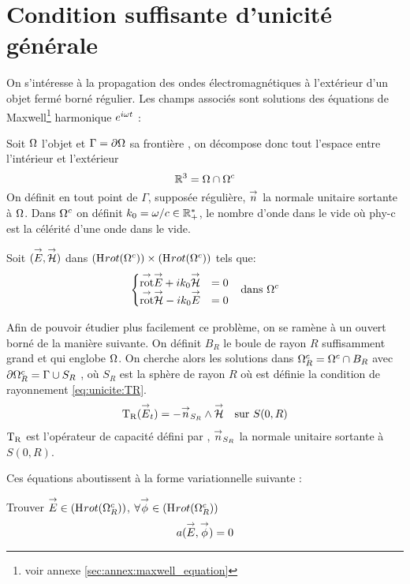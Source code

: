 \section{Condition suffisante d'unicité générale}

  On s’intéresse à la propagation des ondes électromagnétiques à l'extérieur d'un objet fermé borné régulier. Les champs associés sont solutions des équations de Maxwell\footnote{voir annexe \ref{sec:annex:maxwell_equation}} harmonique \(e^{i\omega t}\) :

  Soit \(\Omega\) l'objet et \(\Gamma=\partial\Omega\) sa frontière , on décompose donc tout l'espace entre l'intérieur et l'extérieur 
  \[
    \mathbb R^3 = \Omega\cap\Omega^c
  \]
  On définit en tout point de \(\Gamma\), supposée régulière, \({\overset{\rightarrow}{n}}\) la normale unitaire sortante à \(\Omega\).
 Dans \(\Omega^c\) on définit \(k_0=\omega / c \in \mathbb R_+^*\), le nombre d'onde dans le vide où \gls{phy-c} est la célérité d'une onde dans le vide.

  Soit \(({\overset{\rightarrow}{E}},{\overset{\rightarrow}{\mathcal{H}}})\) dans \((\mathrm{H}_\mathrm{{}}{rot}(\Omega^c)) \times (\mathrm{H}_\mathrm{{}}{rot}(\Omega^c))\) tels que:
  \begin{align}
  \left\lbrace
    \begin{matrix}
      {{\overset{\rightarrow}{\operatorname{rot}}}} {\overset{\rightarrow}{E}} + i k_0 {\overset{\rightarrow}{\mathcal{H}}} &= 0
      \\
      {{\overset{\rightarrow}{\operatorname{rot}}}} {\overset{\rightarrow}{\mathcal{H}}} - i k_0 {\overset{\rightarrow}{E}} &= 0
    \end{matrix}
    \right. && \text{dans \(\Omega^c\)}
    \label{eq:unicite:maxwell_ext}
  \end{align}

  Afin de pouvoir étudier plus facilement ce problème, on se ramène à un ouvert borné de la manière suivante. On définit \(B_R\) le boule de rayon \(R\) suffisamment grand et qui englobe \(\Omega\). On cherche alors les solutions dans \(\Omega^c_R=\Omega^c\cap B_R\) avec \(\partial\Omega^c_R = \Gamma\cup S_R\) , où \(S_R\) est la sphère de rayon \(R\) où est définie la condition de rayonnement \eqref{eq:unicite:TR}.
  \begin{equation}
    \label{eq:unicite:TR}
    \begin{aligned}
    \operatorname{T_R}({\overset{\rightarrow}{E}}_t) = - {\overset{\rightarrow}{n}}_{S_R} \wedge {\overset{\rightarrow}{\mathcal{H}}} && \text{sur \(S(0,R)\)}
    \end{aligned}
  \end{equation}
  \(\operatorname{T_R}\) est l'opérateur de capacité défini par \cite[p.~200]{nedelec_acoustic_2001}, \({\overset{\rightarrow}{n}}_{S_R}\) la normale unitaire sortante à \(S(0,R)\).

  Ces équations aboutissent à la forme variationnelle suivante :
  \begin{prop}
    Trouver \({\overset{\rightarrow}{E}} \in \left(\mathrm{H}_\mathrm{{}}{rot}(\Omega^c_R)\right)\), \(\forall {\overset{\rightarrow}{\phi}} \in \left(\mathrm{H}_\mathrm{{}}{rot}(\Omega^c_R)\right)\)
    \[
      a({\overset{\rightarrow}{E}},{\overset{\rightarrow}{\phi}}) = 0
    \]
  \end{prop}

